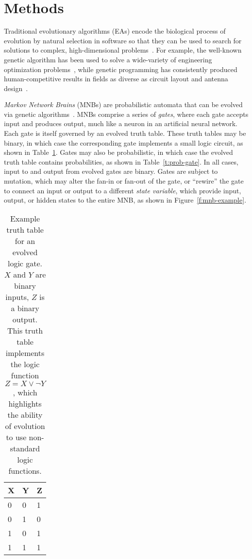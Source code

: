 \section{Methods}\label{s:methods}


Traditional evolutionary algorithms (EAs) encode the biological process of evolution by natural selection in software so that they can be used to search for solutions to complex, high-dimensional problems~\cite{Eiben:2003tf}.  For example, the well-known genetic algorithm has been used to solve a wide-variety of engineering optimization problems~\cite{Goldberg:1989uj}, while genetic programming has consistently produced human-competitive results in fields as diverse as circuit layout and antenna design~\cite{Koza:2005wg,Lohn:2004to}.

{\em Markov Network Brains} (MNBs) are probabilistic automata that can be evolved via genetic algorithms~\cite{Edlund:2011kt}.  MNBs comprise a series of {\em gates}, where each gate accepts input and produces output, much like a neuron in an artificial neural network.  Each gate is itself governed by an evolved truth table.  
%
These truth tables may be binary, in which case the corresponding gate implements a small logic circuit, as shown in Table~\ref{t:logic-gate}.  Gates may also be probabilistic, in which case the evolved truth table contains probabilities, as shown in Table~\ref{t:prob-gate}.  In all cases, input to and output from evolved gates are binary.  Gates are subject to mutation, which may alter the fan-in or fan-out of the gate, or ``rewire''  the gate to connect an input or output to a different {\em state variable}, which provide input, output, or hidden states to the entire MNB, as shown in Figure~\ref{f:mnb-example}.

\begin{table}[h]
    \centering
    \caption{Example truth table for an evolved logic gate.  $X$ and $Y$ are binary inputs, $Z$ is a binary output.  This truth table implements the logic function $Z=X \lor \lnot Y$, which highlights the ability of evolution to use non-standard logic functions.}
    \begin{tabular}{ll|l}
    \hline
        {\bf X} & {\bf Y} & {\bf Z} \\\hline
        0 & 0 & 1\\
        0 & 1 & 0\\
        1 & 0 & 1\\
        1 & 1 & 1\\
        \hline
    \end{tabular}
    \label{t:logic-gate}
\end{table}

